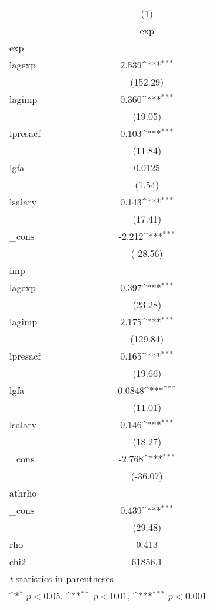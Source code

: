 {
\def\sym#1{\ifmmode^{#1}\else\(^{#1}\)\fi}
\begin{tabular}{l*{1}{c}}
\hline\hline
            &\multicolumn{1}{c}{(1)}\\
            &\multicolumn{1}{c}{exp}\\
\hline
exp         &                     \\
lagexp      &       2.539\sym{***}\\
            &    (152.29)         \\
[1em]
lagimp      &       0.360\sym{***}\\
            &     (19.05)         \\
[1em]
lpresacf    &       0.103\sym{***}\\
            &     (11.84)         \\
[1em]
lgfa        &      0.0125         \\
            &      (1.54)         \\
[1em]
lsalary     &       0.143\sym{***}\\
            &     (17.41)         \\
[1em]
\_cons      &      -2.212\sym{***}\\
            &    (-28.56)         \\
\hline
imp         &                     \\
lagexp      &       0.397\sym{***}\\
            &     (23.28)         \\
[1em]
lagimp      &       2.175\sym{***}\\
            &    (129.84)         \\
[1em]
lpresacf    &       0.165\sym{***}\\
            &     (19.66)         \\
[1em]
lgfa        &      0.0848\sym{***}\\
            &     (11.01)         \\
[1em]
lsalary     &       0.146\sym{***}\\
            &     (18.27)         \\
[1em]
\_cons      &      -2.768\sym{***}\\
            &    (-36.07)         \\
\hline
athrho      &                     \\
\_cons      &       0.439\sym{***}\\
            &     (29.48)         \\
\hline
rho         &       0.413         \\
chi2        &     61856.1         \\
\hline\hline
\multicolumn{2}{l}{\footnotesize \textit{t} statistics in parentheses}\\
\multicolumn{2}{l}{\footnotesize \sym{*} \(p<0.05\), \sym{**} \(p<0.01\), \sym{***} \(p<0.001\)}\\
\end{tabular}
}
